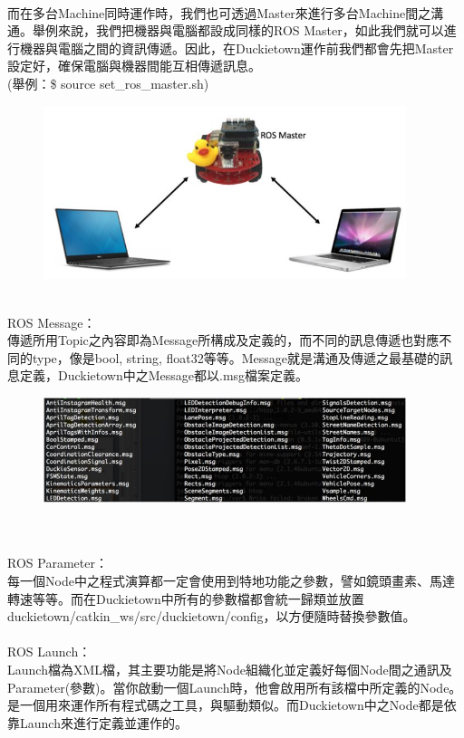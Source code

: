 \documentclass{article}
\begin{document}
\\而在多台Machine同時運作時，我們也可透過Master來進行多台Machine間之溝通。舉例來說，我們把機器與電腦都設成同樣的ROS Master，如此我們就可以進行機器與電腦之間的資訊傳遞。因此，在Duckietown運作前我們都會先把Master設定好，確保電腦與機器間能互相傳遞訊息。 
\\(舉例：\$ source set\_ros\_master.sh)
\begin{figure}[htp]
    \begin{center}
        \includegraphics[width=300pt]{pic/圖片21.jpg}
    \end{center}
\end{figure}
\\ROS Message：
\\傳遞所用Topic之內容即為Message所構成及定義的，而不同的訊息傳遞也對應不同的type，像是bool, string, float32等等。Message就是溝通及傳遞之最基礎的訊息定義，Duckietown中之Message都以.msg檔案定義。
\begin{figure}[htp]
    \begin{center}
        \includegraphics[width=300pt]{pic/圖片22.jpg}
    \end{center}
\end{figure}
\\
\\ROS Parameter：
\\每一個Node中之程式演算都一定會使用到特地功能之參數，譬如鏡頭畫素、馬達轉速等等。而在Duckietown中所有的參數檔都會統一歸類並放置duckietown/catkin\_ws/src/duckietown/config，以方便隨時替換參數值。
\\
\\ROS Launch：
\\Launch檔為XML檔，其主要功能是將Node組織化並定義好每個Node間之通訊及Parameter(參數)。當你啟動一個Launch時，他會啟用所有該檔中所定義的Node。是一個用來運作所有程式碼之工具，與驅動類似。而Duckietown中之Node都是依靠Launch來進行定義並運作的。
\end{document}
